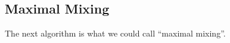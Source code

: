 
\clearpage
\subsection{Maximal Mixing}\label{sec:maximal-mixing}

The next algorithm is what we could call \enquote{maximal mixing}. 

